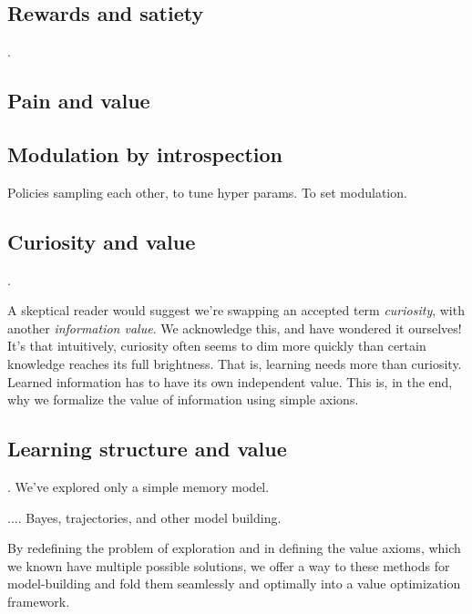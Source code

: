 \documentclass[9pt,twocolumn,twoside]{pnas-new}
\begin{document}
\subsection*{Rewards and satiety}.

\subsection{Pain and value}

\subsection{Modulation by introspection}
Policies sampling each other, to tune hyper params. To set modulation.



\subsection*{Curiosity and value}.

A skeptical reader would suggest we're swapping an accepted term \textit{curiosity}, with another \textit{information value}. We acknowledge this, and have wondered it ourselves! It's that intuitively, curiosity often seems to dim more quickly than certain knowledge reaches its full brightness. That is, learning needs more than curiosity. Learned information has to have its own independent value. This is, in the end, why we formalize the value of information using simple axions. 

\subsection*{Learning structure and value}.
We've explored only a simple memory model. 

.... Bayes, trajectories, and other model building.

By redefining the problem of exploration and in defining the value axioms, which we known have multiple possible solutions, we offer a way to these methods for model-building and fold them seamlessly and optimally into a value optimization framework. 


\end{document}
